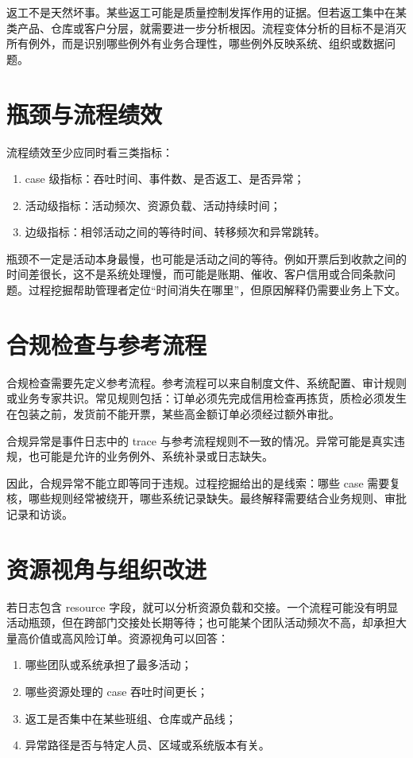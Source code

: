 \documentclass[UTF8,fontset=fandol,openany,zihao=-4]{ctexbook}
\begin{document}
返工不是天然坏事。某些返工可能是质量控制发挥作用的证据。但若返工集中在某类产品、仓库或客户分层，就需要进一步分析根因。流程变体分析的目标不是消灭所有例外，而是识别哪些例外有业务合理性，哪些例外反映系统、组织或数据问题。

\section{瓶颈与流程绩效}

流程绩效至少应同时看三类指标：
\begin{enumerate}
  \item case 级指标：吞吐时间、事件数、是否返工、是否异常；
  \item 活动级指标：活动频次、资源负载、活动持续时间；
  \item 边级指标：相邻活动之间的等待时间、转移频次和异常跳转。
\end{enumerate}

瓶颈不一定是活动本身最慢，也可能是活动之间的等待。例如开票后到收款之间的时间差很长，这不是系统处理慢，而可能是账期、催收、客户信用或合同条款问题。过程挖掘帮助管理者定位“时间消失在哪里”，但原因解释仍需要业务上下文。

\section{合规检查与参考流程}

合规检查需要先定义参考流程。参考流程可以来自制度文件、系统配置、审计规则或业务专家共识。常见规则包括：订单必须先完成信用检查再拣货，质检必须发生在包装之前，发货前不能开票，某些高金额订单必须经过额外审批。

\begin{definition}[合规异常]
合规异常是事件日志中的 trace 与参考流程规则不一致的情况。异常可能是真实违规，也可能是允许的业务例外、系统补录或日志缺失。
\end{definition}

因此，合规异常不能立即等同于违规。过程挖掘给出的是线索：哪些 case 需要复核，哪些规则经常被绕开，哪些系统记录缺失。最终解释需要结合业务规则、审批记录和访谈。

\section{资源视角与组织改进}

若日志包含 resource 字段，就可以分析资源负载和交接。一个流程可能没有明显活动瓶颈，但在跨部门交接处长期等待；也可能某个团队活动频次不高，却承担大量高价值或高风险订单。资源视角可以回答：
\begin{enumerate}
  \item 哪些团队或系统承担了最多活动；
  \item 哪些资源处理的 case 吞吐时间更长；
  \item 返工是否集中在某些班组、仓库或产品线；
  \item 异常路径是否与特定人员、区域或系统版本有关。
\end{enumerate}
\end{document}
